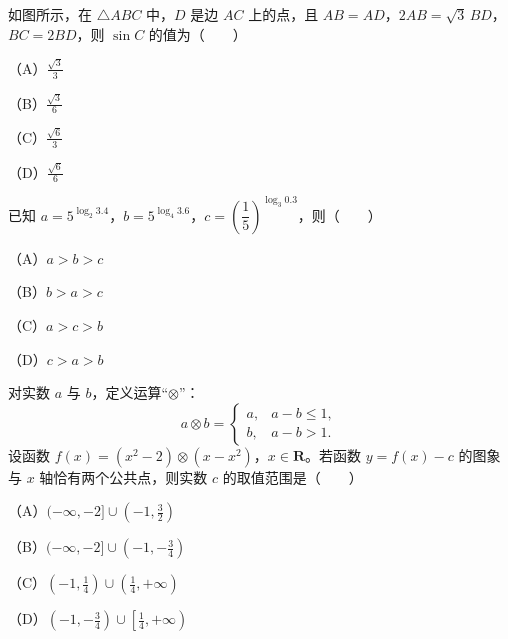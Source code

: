 \begin{question}
如图所示，在 $\triangle ABC$ 中，$D$ 是边 $AC$ 上的点，且 $AB=AD$，$2AB=\sqrt3\,BD$，$BC=2BD$，则 $\sin C$ 的值为\mbox{（　　）}

（A）$\frac{\sqrt3}{3}$

（B）$\frac{\sqrt3}{6}$

（C）$\frac{\sqrt6}{3}$

（D）$\frac{\sqrt6}{6}$
\nopagebreak[4]
\begin{center}\end{center}
\nopagebreak[4]
\end{question}
\begin{question}
已知 $a=5^{\log_2 3.4}$，$b=5^{\log_4 3.6}$，$c=\left(\dfrac15\right)^{\log_3 0.3}$，则\mbox{（　　）}

（A）$a>b>c$

（B）$b>a>c$

（C）$a>c>b$

（D）$c>a>b$

\end{question}
\begin{question}
对实数 $a$ 与 $b$，定义运算“$\otimes$”：
\nopagebreak[4]
\[a\otimes b=\begin{cases}a,& a-b\leqslant1,\\ b,& a-b>1.\end{cases}\]
设函数 $f(x)=(x^2-2)\otimes(x-x^2)$，$x\in\mathbf{R}$。若函数 $y=f(x)-c$ 的图象与 $x$ 轴恰有两个公共点，则实数 $c$ 的取值范围是\mbox{（　　）}

（A）$(-\infty,-2]\cup\left(-1,\frac32\right)$

（B）$(-\infty,-2]\cup\left(-1,-\frac34\right)$

（C）$\left(-1,\frac14\right)\cup\left(\frac14,+\infty\right)$

（D）$\left(-1,-\frac34\right)\cup\left[\frac14,+\infty\right)$

\end{question}


